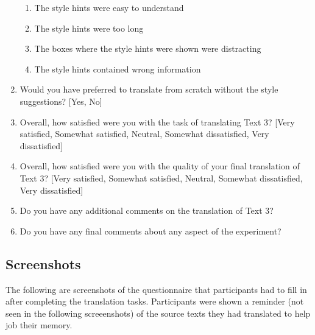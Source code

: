 \begin{enumerate}
\begin{enumerate}
            \item The style hints were easy to understand
            \item The style hints were too long
            \item The boxes where the style hints were shown were distracting
            \item The style hints contained wrong information
        \end{enumerate}
    \item Would you have preferred to translate from scratch without the style suggestions? [Yes, No]
    \item Overall, how satisfied were you with the task of translating Text 3? [Very satisfied, Somewhat satisfied, Neutral, Somewhat dissatisfied, Very dissatisfied]
    \item Overall, how satisfied were you with the quality of your final translation of Text 3? [Very satisfied, Somewhat satisfied, Neutral, Somewhat dissatisfied, Very dissatisfied]
    \item Do you have any additional comments on the translation of Text 3?
    \item Do you have any final comments about any aspect of the experiment?
\end{enumerate}

\subsection{Screenshots}

\noindent The following are screenshots of the questionnaire that participants had to fill in after completing the translation tasks. Participants were shown a reminder (not seen in the following screeenshots) of the source texts they had translated to help job their memory.

